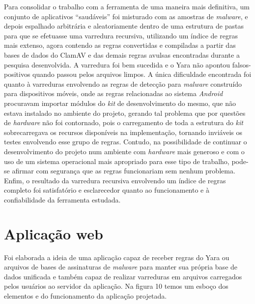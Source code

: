 Para consolidar o trabalho com a ferramenta de uma maneira mais definitiva, um
conjunto de aplicativos ``saudáveis'' foi misturado com as amostras de
\textit{malware}, e depois espalhado arbitrária e aleatoriamente dentro de uma
estrutura de pastas para que se efetuasse uma varredura recursiva, utilizando um
índice de regras mais extenso, agora contendo as regras convertidas e compiladas
a partir das bases de dados do ClamAV e das demais regras avulsas encontradas
durante a pesquisa desenvolvida. A varredura foi bem sucedida e o Yara não
apontou falsos-positivos quando passou pelos arquivos limpos. A única
dificuldade encontrada foi quanto à varreduras envolvendo as regras de detecção
para \textit{malware} construído para dispositivos móveis, onde as regras
relacionadas ao sistema \textit{Android} procuravam importar módulos do
\textit{kit} de desenvolvimento do mesmo, que não estava instalado no ambiente
do projeto, gerando tal problema que por questões de \textit{hardware} não foi
contornado, pois o carregamento de toda a estrutura do \textit{kit}
sobrecarregava os recursos disponíveis na implementação,  tornando inviáveis os
testes envolvendo esse grupo de regras. Contudo, na possibilidade de continuar o
desenvolvimento do projeto num ambiente com \textit{hardware} mais generoso e
com o uso de um sistema operacional mais apropriado para esse tipo de trabalho,
pode-se afirmar com segurança que as regras funcionariam sem nenhum problema.
Enfim, o resultado da varredura recursiva envolvendo um índice de regras
completo foi satisfatório e  esclarecedor quanto ao funcionamento e à
confiabilidade da ferramenta estudada.

\section{Aplicação web}
\label{s.prototipo}

Foi elaborada a ideia de uma aplicação capaz de receber regras do Yara ou
arquivos de bases de assinaturas de \textit{malware} para manter sua própria
base de dados unificada e também capaz de realizar varreduras em arquivos
carregados pelos usuários ao servidor da aplicação. Na figura 10 temos um
esboço dos elementos e do funcionamento da aplicação projetada.

